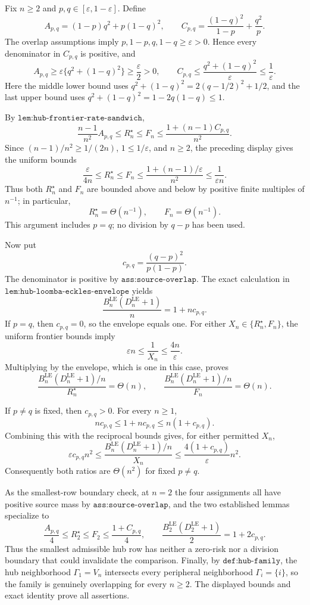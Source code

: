 Fix \(n\ge 2\) and \(p,q\in[\varepsilon,1-\varepsilon]\).  Define
\[
 A_{p,q}=(1-p)q^2+p(1-q)^2,
 \qquad
 C_{p,q}=\frac{(1-q)^2}{1-p}+\frac{q^2}{p}.
\]
The overlap assumptions imply \(p,1-p,q,1-q\ge\varepsilon>0\).  Hence every denominator in \(C_{p,q}\) is positive, and
\[
 A_{p,q}
 \ge \varepsilon\{q^2+(1-q)^2\}
 \ge \frac{\varepsilon}{2}>0,
 \qquad
 C_{p,q}
 \le \frac{q^2+(1-q)^2}{\varepsilon}
 \le \frac1\varepsilon.
\]
Here the middle lower bound uses
\(q^2+(1-q)^2=2(q-1/2)^2+1/2\), and the last upper bound uses
\(q^2+(1-q)^2=1-2q(1-q)\le1\).

By \(\texttt{lem:hub-frontier-rate-sandwich}\),
\[
 \frac{n-1}{n^2}A_{p,q}
 \le R_n^{\star}\le F_n
 \le \frac{1+(n-1)C_{p,q}}{n^2}.
\]
Since \((n-1)/n^2\ge1/(2n)\), \(1\le1/\varepsilon\), and \(n\ge2\), the preceding display gives the uniform bounds
\[
 \frac{\varepsilon}{4n}
 \le R_n^{\star}\le F_n
 \le \frac{1+(n-1)/\varepsilon}{n^2}
 \le \frac1{\varepsilon n}.
\]
Thus both \(R_n^{\star}\) and \(F_n\) are bounded above and below by positive finite multiples of \(n^{-1}\); in particular,
\[
 R_n^{\star}=\Theta(n^{-1}),
 \qquad
 F_n=\Theta(n^{-1}).
\]
This argument includes \(p=q\); no division by \(q-p\) has been used.

Now put
\[
 c_{p,q}=\frac{(q-p)^2}{p(1-p)}.
\]
The denominator is positive by \(\texttt{ass:source-overlap}\).  The exact calculation in
\(\texttt{lem:hub-loomba-eckles-envelope}\) yields
\[
 \frac{B_n^{\mathrm{LE}}(D_n^{\mathrm{LE}}+1)}{n}
 =1+n c_{p,q}.
\]
If \(p=q\), then \(c_{p,q}=0\), so the envelope equals one.  For either
\(X_n\in\{R_n^{\star},F_n\}\), the uniform frontier bounds imply
\[
 \varepsilon n
 \le \frac1{X_n}
 \le \frac{4n}{\varepsilon}.
\]
Multiplying by the envelope, which is one in this case, proves
\[
 \frac{B_n^{\mathrm{LE}}(D_n^{\mathrm{LE}}+1)/n}{R_n^{\star}}
 =\Theta(n),
 \qquad
 \frac{B_n^{\mathrm{LE}}(D_n^{\mathrm{LE}}+1)/n}{F_n}
 =\Theta(n).
\]

If \(p\ne q\) is fixed, then \(c_{p,q}>0\).  For every \(n\ge1\),
\[
 n c_{p,q}\le 1+n c_{p,q}\le n(1+c_{p,q}).
\]
Combining this with the reciprocal bounds gives, for either permitted \(X_n\),
\[
 \varepsilon c_{p,q}n^2
 \le
 \frac{B_n^{\mathrm{LE}}(D_n^{\mathrm{LE}}+1)/n}{X_n}
 \le
 \frac{4(1+c_{p,q})}{\varepsilon}n^2.
\]
Consequently both ratios are \(\Theta(n^2)\) for fixed \(p\ne q\).

As the smallest-row boundary check, at \(n=2\) the four assignments all have positive source mass by \(\texttt{ass:source-overlap}\), and the two established lemmas specialize to
\[
 \frac{A_{p,q}}4\le R_2^{\star}\le F_2\le\frac{1+C_{p,q}}4,
 \qquad
 \frac{B_2^{\mathrm{LE}}(D_2^{\mathrm{LE}}+1)}2=1+2c_{p,q}.
\]
Thus the smallest admissible hub row has neither a zero-risk nor a division boundary that could invalidate the comparison.  Finally, by \(\texttt{def:hub-family}\), the hub neighborhood \(\Gamma_1=V_n\) intersects every peripheral neighborhood \(\Gamma_i=\{i\}\), so the family is genuinely overlapping for every \(n\ge2\).  The displayed bounds and exact identity prove all assertions.